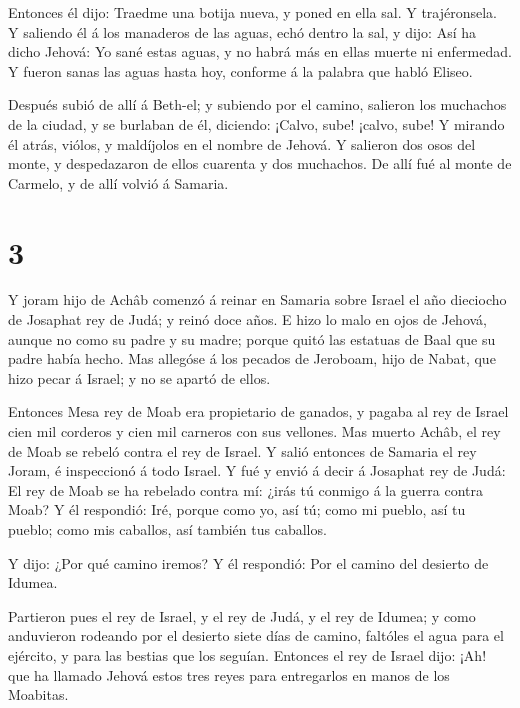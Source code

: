  Entonces él dijo: Traedme una botija nueva, y poned en
ella sal. Y trajéronsela.  Y saliendo él á los manaderos de
las aguas, echó dentro la sal, y dijo: Así ha dicho Jehová: Yo sané
estas aguas, y no habrá más en ellas muerte ni enfermedad. 
Y fueron sanas las aguas hasta hoy, conforme á la palabra que habló
Eliseo.

 Después subió de allí á Beth-el; y subiendo por el camino,
salieron los muchachos de la ciudad, y se burlaban de él, diciendo:
¡Calvo, sube! ¡calvo, sube!  Y mirando él atrás, viólos, y
maldíjolos en el nombre de Jehová. Y salieron dos osos del monte, y
despedazaron de ellos cuarenta y dos muchachos.  De allí
fué al monte de Carmelo, y de allí volvió á Samaria.

\hypertarget{section-2}{%
\section{3}\label{section-2}}

 Y joram hijo de Achâb comenzó á reinar en Samaria sobre
Israel el año dieciocho de Josaphat rey de Judá; y reinó doce años.
 E hizo lo malo en ojos de Jehová, aunque no como su padre y
su madre; porque quitó las estatuas de Baal que su padre había hecho.
 Mas allegóse á los pecados de Jeroboam, hijo de Nabat, que
hizo pecar á Israel; y no se apartó de ellos.

 Entonces Mesa rey de Moab era propietario de ganados, y
pagaba al rey de Israel cien mil corderos y cien mil carneros con sus
vellones.  Mas muerto Achâb, el rey de Moab se rebeló contra
el rey de Israel.  Y salió entonces de Samaria el rey Joram,
é inspeccionó á todo Israel.  Y fué y envió á decir á
Josaphat rey de Judá: El rey de Moab se ha rebelado contra mí: ¿irás tú
conmigo á la guerra contra Moab? Y él respondió: Iré, porque como yo,
así tú; como mi pueblo, así tu pueblo; como mis caballos, así también
tus caballos.

 Y dijo: ¿Por qué camino iremos? Y él respondió: Por el
camino del desierto de Idumea.

 Partieron pues el rey de Israel, y el rey de Judá, y el rey
de Idumea; y como anduvieron rodeando por el desierto siete días de
camino, faltóles el agua para el ejército, y para las bestias que los
seguían.  Entonces el rey de Israel dijo: ¡Ah! que ha
llamado Jehová estos tres reyes para entregarlos en manos de los
Moabitas.

